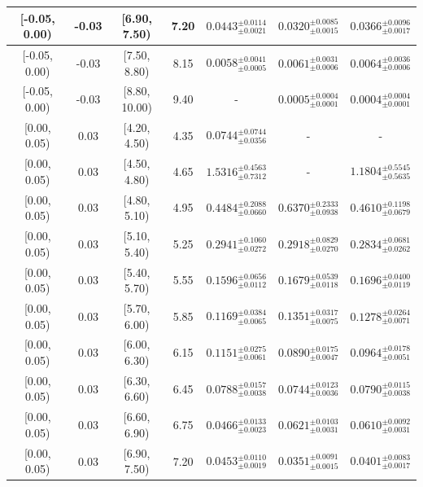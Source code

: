 \begin{longtable}{|c|c|c|c|c|c|c|}
\hline
[-0.05, 0.00) & -0.03 & [6.90, 7.50) & 7.20 & $0.0443^{ \pm 0.0114 }_{ \pm 0.0021 }$ & $0.0320^{ \pm 0.0085 }_{ \pm 0.0015 }$ & $0.0366^{ \pm 0.0096 }_{ \pm 0.0017 }$ \\ 
\hline
[-0.05, 0.00) & -0.03 & [7.50, 8.80) & 8.15 & $0.0058^{ \pm 0.0041 }_{ \pm 0.0005 }$ & $0.0061^{ \pm 0.0031 }_{ \pm 0.0006 }$ & $0.0064^{ \pm 0.0036 }_{ \pm 0.0006 }$ \\ 
\hline
[-0.05, 0.00) & -0.03 & [8.80, 10.00) & 9.40 & - & $0.0005^{ \pm 0.0004 }_{ \pm 0.0001 }$ & $0.0004^{ \pm 0.0004 }_{ \pm 0.0001 }$ \\ 
\hline
[0.00, 0.05) & 0.03 & [4.20, 4.50) & 4.35 & $0.0744^{ \pm 0.0744 }_{ \pm 0.0356 }$ & - & - \\ 
\hline
[0.00, 0.05) & 0.03 & [4.50, 4.80) & 4.65 & $1.5316^{ \pm 0.4563 }_{ \pm 0.7312 }$ & - & $1.1804^{ \pm 0.5545 }_{ \pm 0.5635 }$ \\ 
\hline
[0.00, 0.05) & 0.03 & [4.80, 5.10) & 4.95 & $0.4484^{ \pm 0.2088 }_{ \pm 0.0660 }$ & $0.6370^{ \pm 0.2333 }_{ \pm 0.0938 }$ & $0.4610^{ \pm 0.1198 }_{ \pm 0.0679 }$ \\ 
\hline
[0.00, 0.05) & 0.03 & [5.10, 5.40) & 5.25 & $0.2941^{ \pm 0.1060 }_{ \pm 0.0272 }$ & $0.2918^{ \pm 0.0829 }_{ \pm 0.0270 }$ & $0.2834^{ \pm 0.0681 }_{ \pm 0.0262 }$ \\ 
\hline
[0.00, 0.05) & 0.03 & [5.40, 5.70) & 5.55 & $0.1596^{ \pm 0.0656 }_{ \pm 0.0112 }$ & $0.1679^{ \pm 0.0539 }_{ \pm 0.0118 }$ & $0.1696^{ \pm 0.0400 }_{ \pm 0.0119 }$ \\ 
\hline
[0.00, 0.05) & 0.03 & [5.70, 6.00) & 5.85 & $0.1169^{ \pm 0.0384 }_{ \pm 0.0065 }$ & $0.1351^{ \pm 0.0317 }_{ \pm 0.0075 }$ & $0.1278^{ \pm 0.0264 }_{ \pm 0.0071 }$ \\ 
\hline
[0.00, 0.05) & 0.03 & [6.00, 6.30) & 6.15 & $0.1151^{ \pm 0.0275 }_{ \pm 0.0061 }$ & $0.0890^{ \pm 0.0175 }_{ \pm 0.0047 }$ & $0.0964^{ \pm 0.0178 }_{ \pm 0.0051 }$ \\ 
\hline
[0.00, 0.05) & 0.03 & [6.30, 6.60) & 6.45 & $0.0788^{ \pm 0.0157 }_{ \pm 0.0038 }$ & $0.0744^{ \pm 0.0123 }_{ \pm 0.0036 }$ & $0.0790^{ \pm 0.0115 }_{ \pm 0.0038 }$ \\ 
\hline
[0.00, 0.05) & 0.03 & [6.60, 6.90) & 6.75 & $0.0466^{ \pm 0.0133 }_{ \pm 0.0023 }$ & $0.0621^{ \pm 0.0103 }_{ \pm 0.0031 }$ & $0.0610^{ \pm 0.0092 }_{ \pm 0.0031 }$ \\ 
\hline
[0.00, 0.05) & 0.03 & [6.90, 7.50) & 7.20 & $0.0453^{ \pm 0.0110 }_{ \pm 0.0019 }$ & $0.0351^{ \pm 0.0091 }_{ \pm 0.0015 }$ & $0.0401^{ \pm 0.0083 }_{ \pm 0.0017 }$ \\ 

\end{longtable}
